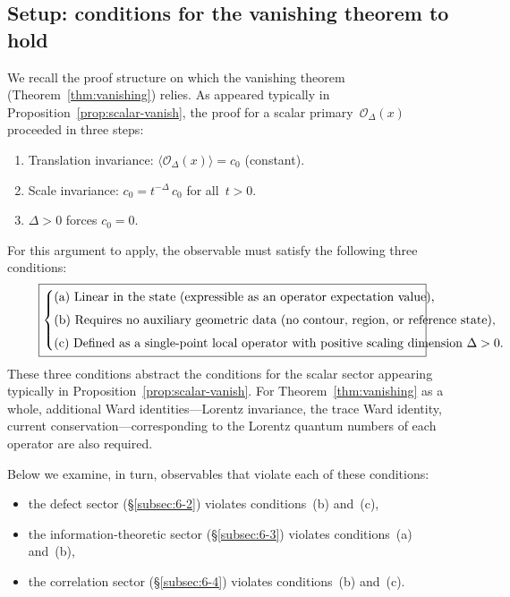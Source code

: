\documentclass[
  aps,
  prd,
  preprint,
  groupedaddress,
  nofootinbib,
  longbibliography
]{revtex4-2}
\theoremstyle{remark}
\begin{document}
\subsection{Setup: conditions for the vanishing theorem to hold}%
  \label{subsec:6-1}

We recall the proof structure on which the vanishing theorem
(Theorem~\ref{thm:vanishing}) relies.
As appeared typically in Proposition~\ref{prop:scalar-vanish},
the proof for a scalar primary~$\mathcal{O}_\Delta(x)$ proceeded
in three steps:
\begin{enumerate}
\item Translation invariance:
  $\langle\mathcal{O}_\Delta(x)\rangle = c_0$ (constant).
\item Scale invariance:
  $c_0 = t^{-\Delta}\,c_0$ for all~$t>0$.
\item $\Delta>0$ forces $c_0=0$.
\end{enumerate}

For this argument to apply, the observable must satisfy the
following three conditions:
\begin{equation}\label{eq:three-conditions}
  \fbox{\parbox{0.88\columnwidth}{%
  $\begin{cases}
  \text{(a) Linear in the state
    (expressible as an operator expectation value),}\\[4pt]
  \text{(b) Requires no auxiliary geometric data
    (no contour, region, or reference state),}\\[4pt]
  \text{(c) Defined as a single-point local operator
    with positive scaling dimension $\Delta>0$.}
  \end{cases}$}}
\end{equation}
These three conditions abstract the conditions for the scalar
sector appearing typically in
Proposition~\ref{prop:scalar-vanish}.
For Theorem~\ref{thm:vanishing} as a whole, additional Ward
identities---Lorentz invariance, the trace Ward identity, current
conservation---corresponding to the Lorentz quantum numbers of
each operator are also required.

Below we examine, in turn, observables that violate each of these
conditions:
\begin{itemize}
\item the defect sector (\S\ref{subsec:6-2}) violates
  conditions~(b) and~(c),
\item the information-theoretic sector (\S\ref{subsec:6-3})
  violates conditions~(a) and~(b),
\item the correlation sector (\S\ref{subsec:6-4}) violates
  conditions~(b) and~(c).
\end{itemize}
\end{document}
